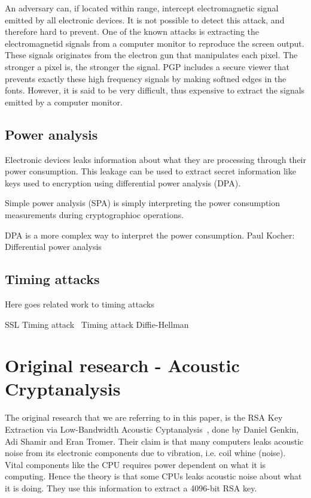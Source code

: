 An adversary can, if located within range, intercept electromagnetic signal emitted by all electronic devices. 
It is not possible to detect this attack, and therefore hard to prevent. 
One of the known attacks is extracting the electromagnetid signals from a computer monitor to reproduce the screen output.
These signals originates from the electron gun that manipulates each pixel\cite{tempest_sans}. 
The stronger a pixel is, the stronger the signal.
PGP includes a secure viewer that prevents exactly these high frequency signals by making softned edges in the fonts.
However, it is said to be very difficult, thus expensive to extract the signals emitted by a computer monitor. 

\subsection{Power analysis}\label{sec:power_analysis}

Electronic devices leaks information about what they are processing through their power consumption.
This leakage can be used to extract secret information like keys used to encryption using differential power analysis (DPA). 

Simple power analysis (SPA) is simply interpreting the power consumption measurements during cryptographioc operations\cite{dpa_kocher}. 

DPA is a more complex way to interpret the power consumption. 
Paul Kocher: Differential power analysis \cite{dpa_kocher}

\subsection{Timing attacks}\label{sec:timing_attacks}

Here goes related work to timing attacks

SSL Timing attack~\cite{ssl_timing_attack}
Timing attack Diffie-Hellman~\cite{timing_attack_kocher}

\section{Original research - Acoustic Cryptanalysis}\label{sec:original_research}

The original research that we are referring to in this paper, is the RSA Key Extraction via Low-Bandwidth Acoustic Cyptanalysis~\cite{original_paper}, done by Daniel Genkin, Adi Shamir and Eran Tromer.
Their claim is that many computers leaks acoustic noise from its electronic components due to vibration, i.e. coil whine (noise).
Vital components like the CPU requires power dependent on what it is computing.
Hence the theory is that some CPUs leaks acoustic noise about what it is doing.
They use this information to extract a 4096-bit RSA key.

